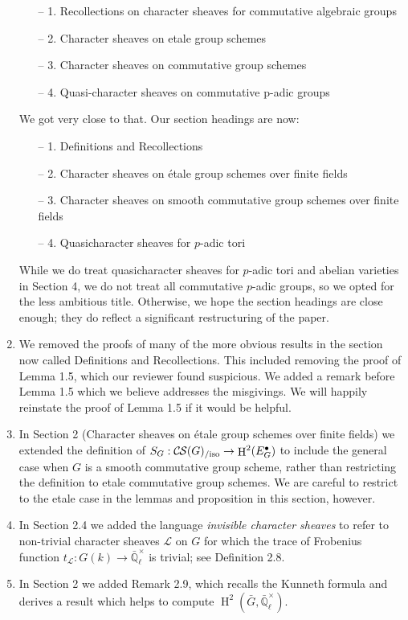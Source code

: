 \documentclass[a4, 10pt]{amsart}
\theoremstyle{definition}
\theoremstyle{remark}
\newcommand{\EE}{\mathbb{\bar Q}_\ell}
\newcommand{\EEx}{\EE^\times}
\DeclareMathOperator{\Hh}{H}
\newcommand{\CS}{{\mathcal{C\hskip-0.8pt S}}}
\newcommand{\CSiso}[1]{\CS(#1)_{/\text{iso}}}
\begin{document}
\begin{enumerate}
\begin{enumerate}
\item[– 1.] Recollections on character sheaves for commutative algebraic groups 
\item[– 2.] Character sheaves on etale group schemes
\item[– 3.] Character sheaves on commutative group schemes
\item[– 4.] Quasi-character sheaves on commutative p-adic groups
\end{enumerate}
We got very close to that. Our section headings are now:
\begin{enumerate}
\item[– 1.] Definitions and Recollections 
\item[– 2.] Character sheaves on \'etale group schemes over finite fields
\item[– 3.] Character sheaves on smooth commutative group schemes over finite fields
\item[– 4.] Quasicharacter sheaves for $p$-adic tori
\end{enumerate}
While we do treat quasicharacter sheaves for $p$-adic tori and abelian varieties in Section 4, we do not treat all commutative $p$-adic groups, so we opted for the less ambitious title. Otherwise, we hope the section headings are close enough; they do reflect a significant restructuring of the paper.
\item
We removed the proofs of many of the more obvious results in the section now called Definitions and Recollections. 
This included removing the proof of Lemma 1.5, which our reviewer found suspicious. We added a remark before Lemma 1.5 which we believe addresses the misgivings. We will happily reinstate the proof of Lemma 1.5 if it would be helpful.
\item
In Section 2 (Character sheaves on \'etale group schemes over finite fields) we extended the definition of $S_G : \CSiso{G} \to \Hh^2(E^\bullet_G)$ to include the general case when $G$ is a smooth commutative group scheme, rather than restricting the definition to etale commutative group schemes. We are careful to restrict to the etale case in the lemmas and proposition in this section, however.
\item
In Section 2.4 we added the language {\it invisible character sheaves} to refer to non-trivial character sheaves $\mathcal{L}$ on $G$ for which the trace of Frobenius function $t_\mathcal{L} : G(k) \to \EEx$ is trivial; see Definition 2.8.
\item
In Section 2 we added Remark 2.9, which recalls the Kunneth formula and derives a result which helps to compute $\Hh^2({\bar G}, \EEx)$.

\end{enumerate}
\end{document}

